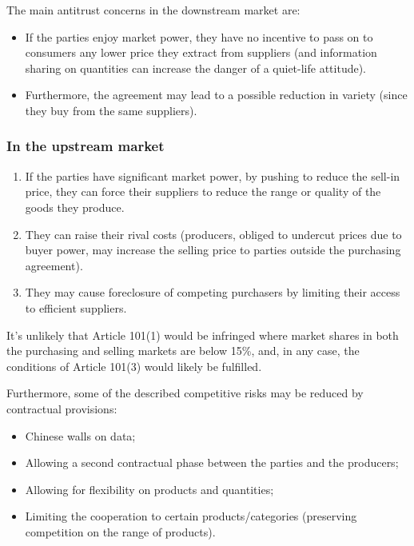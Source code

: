         The main antitrust concerns in the downstream market are:
        \begin{itemize}
            \item If the parties enjoy market power, they have no incentive to pass on to consumers any lower price they extract from suppliers (and information sharing on quantities can increase the danger of a quiet-life attitude).
            \item Furthermore, the agreement may lead to a possible reduction in variety (since they buy from the same suppliers).
        \end{itemize}

        \subsubsection{In the upstream market}

            \begin{enumerate}[label=\alph*)]
                \item If the parties have significant market power, by pushing to reduce the sell-in price, they can force their suppliers to reduce the range or quality of the goods they produce.
                \item They can raise their rival costs (producers, obliged to undercut prices due to buyer power, may increase the selling price to parties outside the purchasing agreement).
                \item They may cause foreclosure of competing purchasers by limiting their access to efficient suppliers.
            \end{enumerate}
            
            It’s unlikely that Article 101(1) would be infringed where market shares in both the purchasing and selling markets are below 15\%, and, in any case, the conditions of Article 101(3) would likely be fulfilled.
            
            Furthermore, some of the described competitive risks may be reduced by contractual provisions:
            \begin{itemize}
                \item Chinese walls on data;
                \item Allowing a second contractual phase between the parties and the producers;
                \item Allowing for flexibility on products and quantities;
                \item Limiting the cooperation to certain products/categories (preserving competition on the range of products).
            \end{itemize}

